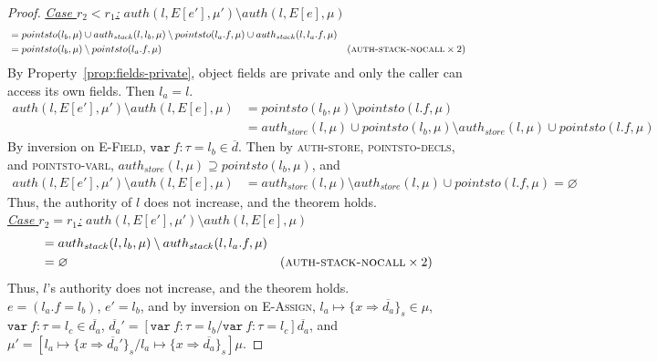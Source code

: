 \documentclass{llncs}
\newcommand{\keywadj}[1]{\mathtt{#1}}
\newcommand{\keyw}[1]{\keywadj{#1}~}
\begin{document}
\begin{proof}
\noindent\underline{\underline{\textit{Case $r_2 < r_1$:}}} $auth(l, E[e'], \mu') \setminus auth(l, E[e], \mu)$
\vspace{-7pt}
\begin{align*}
&= pointsto(l_b, \mu) \cup auth_{stack}(l, l_b, \mu) \setminus pointsto(l_a.f, \mu) \cup auth_{stack}(l, l_a.f, \mu)\\
&= pointsto(l_b, \mu) \setminus pointsto(l_a.f, \mu) & (\textsc{auth-stack-nocall} \times 2)
\end{align*}
By Property~\ref{prop:fields-private}, object fields are private and only the caller can access its own fields. Then $l_a = l$.
\begin{align*}
auth(l, E[e'], \mu') \setminus auth(l, E[e], \mu) &= pointsto(l_b, \mu) \setminus pointsto(l.f, \mu)\\
&= auth_{store}(l, \mu) \cup pointsto(l_b, \mu) \setminus auth_{store}(l, \mu) \cup pointsto(l.f, \mu)
\end{align*}
By inversion on \textsc{E-Field}, $\keyw{var} f : \tau = l_b \in \overline{d}$. Then by \textsc{auth-store}, \textsc{pointsto-decls}, and \textsc{pointsto-varl}, $auth_{store}(l, \mu) \supseteq pointsto(l_b, \mu)$, and
\begin{align*}
auth(l, E[e'], \mu') \setminus auth(l, E[e], \mu) &= auth_{store}(l, \mu) \setminus auth_{store}(l, \mu) \cup pointsto(l.f, \mu) = \varnothing
\end{align*}
Thus, the authority of $l$ does not increase, and the theorem holds.\\

\noindent\underline{\underline{\textit{Case $r_2 = r_1$:}}} $auth(l, E[e'], \mu') \setminus auth(l, E[e], \mu)$
\vspace{-7pt}
\begin{align*}
&= auth_{stack}(l, l_b, \mu) \setminus auth_{stack}(l, l_a.f, \mu)\\ 
&= \varnothing & (\textsc{auth-stack-nocall} \times 2)
\end{align*}
Thus, $l$'s authority does not increase, and the theorem holds.\\


\noindent{}
$e = (l_a.f = l_b)$, $e' = l_b$, and by inversion on \textsc{E-Assign}, $l_a \mapsto \{ x \Rightarrow \overline{d_a} \}_{s} \in \mu$, \mbox{$\keyw{var} f : \tau = l_c \in \overline{d_a}$}, $\overline{d_a}' = [\keyw{var} f : \tau = l_b/\keyw{var} f : \tau = l_c]\overline{d_a}$, and $\mu' = [l_a \mapsto \{ x \Rightarrow \overline{d_a}' \}_{s}/l_a \mapsto \{ x \Rightarrow \overline{d_a} \}_{s}]\mu$.


\end{proof}
\end{document}
